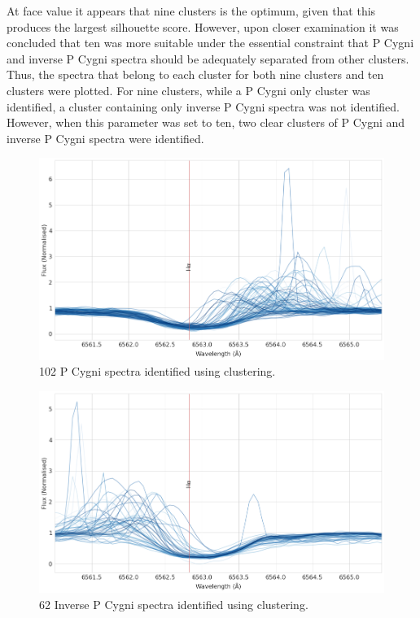 At face value it appears that nine clusters is the optimum, given that this produces the largest silhouette score. However, upon closer examination it was concluded that ten was more suitable under the essential constraint that P Cygni and inverse P Cygni spectra should be adequately separated from other clusters. Thus, the spectra that belong to each cluster for both nine clusters and ten clusters were plotted. For nine clusters, while a P Cygni only cluster was identified, a cluster containing only inverse P Cygni spectra was not identified. However, when this parameter was set to ten, two clear clusters of P Cygni and inverse P Cygni spectra were identified.

\begin{figure}[!htb]
\centering
\includegraphics[scale=0.45]{figures/pcygni.png}
\caption{102 P Cygni spectra identified using clustering.}
\end{figure}

\begin{figure}[!htb]
\centering
\includegraphics[scale=0.45]{figures/inverse p cygni.png}
\caption{62 Inverse P Cygni spectra identified using clustering.}
\label{fig4.6}
\end{figure}

